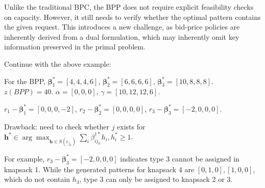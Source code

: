 




Unlike the traditional BPC, the BPP does not require explicit feasibility checks on capacity. However, it still needs to verify whether the optimal pattern contains the given request. This introduces a new challenge, as bid-price policies are inherently derived from a dual formulation, which may inherently omit key information preserved in the primal problem.

\begin{example}
Continue with the above example:

For the BPP, $\bm{\beta}_{1}^{*} = [4, 4, 4, 6]$, $\bm{\beta}_{2}^{*} = [6, 6, 6, 6]$, $\bm{\beta}_{3}^{*} = [10, 8, 8, 8]$. $z(BPP) = 40$. $\alpha = [0, 0, 0]$, $\gamma = [10, 12, 12, 6]$.

$r_{1} - \bm{\beta}_{1}^{*} = [0, 0, 0, -2]$, $r_{2} - \bm{\beta}_{2}^{*} = [0, 0, 0, 0]$, $r_{3} - \bm{\beta}_{3}^{*} = [-2, 0, 0, 0]$.

Drawback: need to check whether $j$ exists for $\bm{h}^{*} \in \arg\max_{\bm{h} \in S(c_{j_0})} \sum_{i} \beta_{ij_0}^{\dag *} h_{i}, h_{i}^{*} \geq 1$.

For example, $r_{3} - \bm{\beta}_{3}^{*} = [-2, 0, 0, 0]$ indicates type 3 cannot be assigned in knapsack 1. While the generated patterns for knapsack 4 are $[0, 1, 0], [1, 0, 0]$, which do not contain $h_{3}$, type 3 can only be assigned to knapsack 2 or 3.
\end{example}

